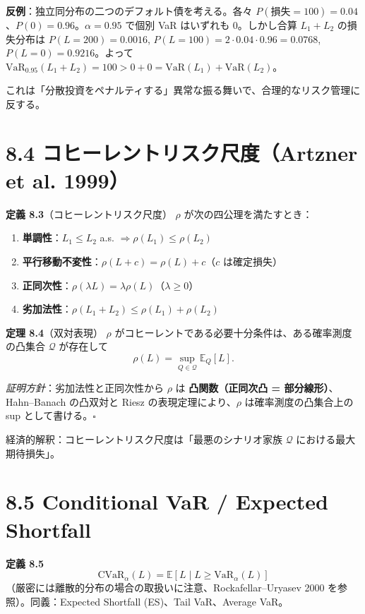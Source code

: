 \documentclass[11pt,a4paper]{report}
\begin{document}
\textbf{反例}：独立同分布の二つのデフォルト債を考える。各々 $P(\text{損失}=100) = 0.04$、$P(0) = 0.96$。$\alpha = 0.95$ で個別 VaR はいずれも 0。しかし合算 $L_1 + L_2$ の損失分布は $P(L=200) = 0.0016$, $P(L=100) = 2 \cdot 0.04 \cdot 0.96 = 0.0768$, $P(L=0) = 0.9216$。よって $\mathrm{VaR}_{0.95}(L_1 + L_2) = 100 > 0 + 0 = \mathrm{VaR}(L_1) + \mathrm{VaR}(L_2)$。

これは「分散投資をペナルティする」異常な振る舞いで、合理的なリスク管理に反する。

\section{8.4 コヒーレントリスク尺度（Artzner et al. 1999）}

\textbf{定義 8.3}（コヒーレントリスク尺度） $\rho$ が次の四公理を満たすとき：
\begin{enumerate}
\item \textbf{単調性}：$L_1 \le L_2$ a.s. $\Rightarrow \rho(L_1) \le \rho(L_2)$
\item \textbf{平行移動不変性}：$\rho(L + c) = \rho(L) + c$（$c$ は確定損失）
\item \textbf{正同次性}：$\rho(\lambda L) = \lambda \rho(L)$（$\lambda \ge 0$）
\item \textbf{劣加法性}：$\rho(L_1 + L_2) \le \rho(L_1) + \rho(L_2)$
\end{enumerate}

\textbf{定理 8.4}（双対表現） $\rho$ がコヒーレントである必要十分条件は、ある確率測度の凸集合 $\mathcal{Q}$ が存在して \[ \rho(L) = \sup_{Q \in \mathcal{Q}} \mathbb{E}_Q[L]. \]

\emph{証明方針}：劣加法性と正同次性から $\rho$ は \textbf{凸関数（正同次凸 = 部分線形）}、Hahn–Banach の凸双対と Riesz の表現定理により、$\rho$ は確率測度の凸集合上の sup として書ける。$\square$

経済的解釈：コヒーレントリスク尺度は「最悪のシナリオ家族 $\mathcal{Q}$ における最大期待損失」。

\section{8.5 Conditional VaR / Expected Shortfall}

\textbf{定義 8.5} \[ \mathrm{CVaR}_\alpha(L) = \mathbb{E}[L \mid L \ge \mathrm{VaR}_\alpha(L)] \] （厳密には離散的分布の場合の取扱いに注意、Rockafellar–Uryasev 2000 を参照）。同義：Expected Shortfall (ES)、Tail VaR、Average VaR。
\end{document}
